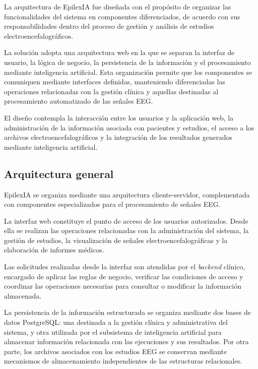 La arquitectura de EpilexIA fue diseñada con el propósito de organizar
las funcionalidades del sistema en componentes diferenciados, de acuerdo
con sus responsabilidades dentro del proceso de gestión y análisis de
estudios electroencefalográficos.

La solución adopta una arquitectura web en la que se separan la
interfaz de usuario, la lógica de negocio, la persistencia de la
información y el procesamiento mediante inteligencia artificial.
Esta organización permite que los componentes se comuniquen mediante
interfaces definidas, manteniendo diferenciadas las operaciones
relacionadas con la gestión clínica y aquellas destinadas al
procesamiento automatizado de las señales EEG.

El diseño contempla la interacción entre los usuarios y la aplicación
web, la administración de la información asociada con pacientes y
estudios, el acceso a los archivos electroencefalográficos y la
integración de los resultados generados mediante inteligencia
artificial.

\subsection{Arquitectura general}
\label{subsec:arquitectura-general}

EpilexIA se organiza mediante una arquitectura cliente-servidor,
complementada con componentes especializados para el procesamiento
de señales EEG.

La interfaz web constituye el punto de acceso de los usuarios
autorizados. Desde ella se realizan las operaciones relacionadas
con la administración del sistema, la gestión de estudios, la
visualización de señales electroencefalográficas y la elaboración
de informes médicos.

Las solicitudes realizadas desde la interfaz son atendidas por
el \textit{backend} clínico, encargado de aplicar las reglas de negocio,
verificar las condiciones de acceso y coordinar las operaciones
necesarias para consultar o modificar la información almacenada.

La persistencia de la información estructurada se organiza mediante dos bases de datos PostgreSQL: una destinada a la gestión clínica y administrativa del sistema, y otra utilizada por el subsistema de inteligencia artificial para almacenar información relacionada con las ejecuciones y sus resultados. Por otra parte, los archivos asociados con los estudios EEG se conservan mediante mecanismos de almacenamiento independientes de las estructuras relacionales.

